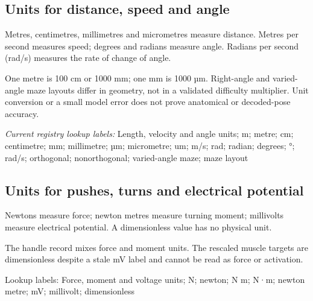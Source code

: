 \begin{samepage}
\subsection*{Units for distance, speed and angle}
\noindent Metres, centimetres, millimetres and micrometres measure distance. Metres per second measures speed; degrees and radians measure angle. Radians per second (rad/s) measures the rate of change of angle.\par
\end{samepage}
\begin{samepage}
\noindent One metre is 100 cm or 1000 mm; one mm is 1000 µm. Right-angle and varied-angle maze layouts differ in geometry, not in a validated difficulty multiplier. Unit conversion or a small model error does not prove anatomical or decoded-pose accuracy.\par\nopagebreak[4]

\end{samepage}


\noindent\textit{Current registry lookup labels:} Length, velocity and angle units; m; metre; cm; centimetre; mm; millimetre; µm; micrometre; um; m/s; rad; radian; degrees; °; rad/s; orthogonal; nonorthogonal; varied-angle maze; maze layout\par

\begin{samepage}
\subsection*{Units for pushes, turns and electrical potential}
\noindent Newtons measure force; newton metres measure turning moment; millivolts measure electrical potential. A dimensionless value has no physical unit.\par
\end{samepage}
\begin{samepage}
\noindent The handle record mixes force and moment units. The rescaled muscle targets are dimensionless despite a stale mV label and cannot be read as force or activation.\par\nopagebreak[4]
\noindent\textnormal{Lookup labels:} Force, moment and voltage units; N; newton; N m; N·m; newton metre; mV; millivolt; dimensionless\par
\end{samepage}


